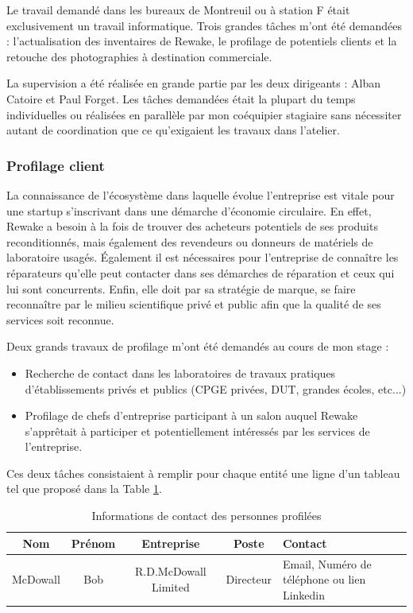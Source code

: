 \documentclass{rapportENSCP}
\begin{document}
Le travail demandé dans les bureaux de Montreuil ou à station F était exclusivement un travail informatique. Trois grandes tâches m'ont été demandées : l'actualisation des inventaires de Rewake, le profilage de potentiels clients et la retouche des photographies à destination commerciale.

La supervision a été réalisée en grande partie par les deux dirigeants : Alban Catoire et Paul Forget. Les tâches demandées était la plupart du temps individuelles ou réalisées en parallèle par mon coéquipier stagiaire sans nécessiter autant de coordination que ce qu'exigaient les travaux dans l'atelier.

\subsubsection{Profilage client}
\label{subsubsec:profilage}
La connaissance de l'écosystème dans laquelle évolue l'entreprise est vitale pour une startup s'inscrivant dans une démarche d'économie circulaire. En effet, Rewake a besoin à la fois de trouver des acheteurs potentiels de ses produits reconditionnés, mais également des revendeurs ou donneurs de matériels de laboratoire usagés. Également il est nécessaires pour l'entreprise de connaître les réparateurs qu'elle peut contacter dans ses démarches de réparation et ceux qui lui sont concurrents. Enfin, elle doit par sa stratégie de marque, se faire reconnaître par le milieu scientifique privé et public afin que la qualité de ses services soit reconnue.

Deux grands travaux de profilage m'ont été demandés au cours de mon stage :
\begin{itemize}
    \item Recherche de contact dans les laboratoires de travaux pratiques d'établissements privés et publics (CPGE privées, DUT, grandes écoles, etc...)
    \item Profilage de chefs d'entreprise participant à un salon auquel Rewake s'apprêtait à participer et potentiellement intéressés par les services de l'entreprise.
\end{itemize}
Ces deux tâches consistaient à remplir pour chaque entité une ligne d'un tableau tel que proposé dans la Table \ref{tab:contact_poste}.

\begin{table}[H]
\centering
\begin{tabularx}{\textwidth}{|c|c|c|c|X|}
\hline
\textbf{Nom} & \textbf{Prénom} & \textbf{Entreprise} & \textbf{Poste} & \textbf{Contact} \\ \hline
McDowall & Bob & R.D.McDowall Limited & Directeur & Email, Numéro de téléphone ou lien Linkedin \\ \hline
\end{tabularx}
\caption{Informations de contact des personnes profilées}
\label{tab:contact_poste}
\end{table}
\end{document}
